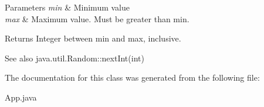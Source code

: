 \begin{DoxyParams}{Parameters}
{\em min} & Minimum value \\
\hline
{\em max} & Maximum value. Must be greater than min. \\
\hline
\end{DoxyParams}
\begin{DoxyReturn}{Returns}
Integer between min and max, inclusive. 
\end{DoxyReturn}
\begin{DoxySeeAlso}{See also}
java.\+util.\+Random\+::next\+Int(int) 
\end{DoxySeeAlso}


The documentation for this class was generated from the following file\+:\begin{DoxyCompactItemize}
\item 
App.\+java\end{DoxyCompactItemize}
